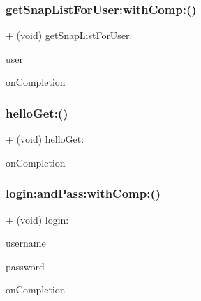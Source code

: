 \hypertarget{interface_get_ae8e3a45bcd2a619dac633c369dbcf886}{}\label{interface_get_ae8e3a45bcd2a619dac633c369dbcf886} 
\subsubsection{\texorpdfstring{get\+Snap\+List\+For\+User\+:with\+Comp\+:()}{getSnapListForUser:withComp:()}}
{\footnotesize\ttfamily + (void) get\+Snap\+List\+For\+User\+: \begin{DoxyParamCaption}\item[{(\hyperlink{interface_user_info}{User\+Info} $\ast$)}]{user }\item[{withComp:(void($^\wedge$)(B\+O\+OL, id))}]{on\+Completion }\end{DoxyParamCaption}}

\hypertarget{interface_get_af1d0a2c1422b398f8f1e5032a78224c8}{}\label{interface_get_af1d0a2c1422b398f8f1e5032a78224c8} 
\subsubsection{\texorpdfstring{hello\+Get\+:()}{helloGet:()}}
{\footnotesize\ttfamily + (void) hello\+Get\+: \begin{DoxyParamCaption}\item[{(void($^\wedge$)(B\+O\+OL, id))}]{on\+Completion }\end{DoxyParamCaption}}

\hypertarget{interface_get_a76426840dad90ee35b87ad57ea87a3ca}{}\label{interface_get_a76426840dad90ee35b87ad57ea87a3ca} 
\subsubsection{\texorpdfstring{login\+:and\+Pass\+:with\+Comp\+:()}{login:andPass:withComp:()}}
{\footnotesize\ttfamily + (void) login\+: \begin{DoxyParamCaption}\item[{(N\+S\+String $\ast$)}]{username }\item[{andPass:(N\+S\+String $\ast$)}]{password }\item[{withComp:(void($^\wedge$)(B\+O\+OL, \hyperlink{interface_snap}{Snap} $\ast$))}]{on\+Completion }\end{DoxyParamCaption}}

